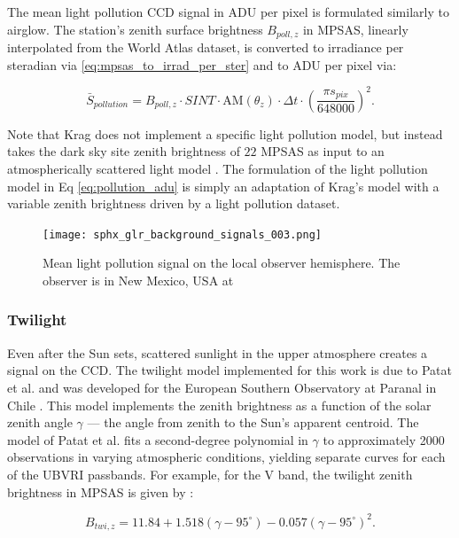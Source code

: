 The mean light pollution CCD signal in ADU per pixel is formulated similarly to airglow. The station's zenith surface brightness $B_{poll,z}$ in MPSAS, linearly interpolated from the World Atlas dataset, is converted to irradiance per steradian via \ref{eq:mpsas_to_irrad_per_ster} and to ADU per pixel via:
 
\begin{equation} \label{eq:pollution_adu}
  \bar{S}_{pollution} = B_{poll,z} \cdot SINT \cdot \textrm{AM}(\theta_z) \cdot \Delta t \cdot \left( \frac{\pi s_{pix}}{648000} \right)^2.
\end{equation}

Note that Krag does not implement a specific light pollution model, but instead takes the dark sky site zenith brightness of $22$ MPSAS as input to an atmospherically scattered light model \cite{krag2003}. The formulation of the light pollution model in Eq \ref{eq:pollution_adu} is simply an adaptation of Krag's model with a variable zenith brightness driven by a light pollution dataset.

\begin{figure}[ht]
  \centering
  \texttt{[image: sphx\_glr\_background\_signals\_003.png]}
  \caption{Mean light pollution signal on the local observer hemisphere. The observer is in New Mexico, USA at
  \pogslla}
  \label{fig:pollution_hemi}
\end{figure}

\subsubsection{Twilight}

Even after the Sun sets, scattered sunlight in the upper atmosphere creates a signal on the CCD. The twilight model implemented for this work is due to Patat et al. and was developed for the European Southern Observatory at Paranal in Chile \cite{patat2006}. This model implements the zenith brightness as a function of the solar zenith angle $\gamma$ --- the angle from zenith to the Sun's apparent centroid. The model of Patat et al. fits a second-degree polynomial in $\gamma$ to approximately 2000 observations in varying atmospheric conditions, yielding separate curves for each of the UBVRI passbands. For example, for the V band, the twilight zenith brightness in MPSAS is given by \cite{patat2006}:

\begin{equation} \label{eq:b_zenith_twilight}
  B_{twi,z} = 11.84 + 1.518(\gamma - 95^\circ) - 0.057 (\gamma -  95^\circ)^2.
\end{equation}

